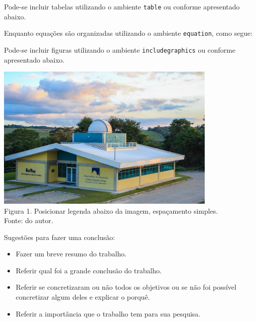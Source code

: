 \documentclass[a0paper,portrait]{baposter}
\begin{document}
\begin{poster}
{}

{Pode-se incluir tabelas utilizando o ambiente \texttt{table} ou conforme apresentado abaixo.

Enquanto equações são organizadas utilizando o ambiente \texttt{equation}, como segue:
}

{Pode-se incluir figuras utilizando o ambiente \texttt{includegraphics} ou conforme apresentado abaixo.

\begin{center}
\includegraphics[width=0.8\textwidth]{figures/observatorio.jpg}\\
Figura 1. Posicionar legenda abaixo da imagem, espaçamento simples.\\
Fonte: do autor.
\end{center}

}

{Sugestões para fazer uma conclusão:
\begin{itemize}
    \item Fazer um breve resumo do trabalho.
    \item Referir qual foi a grande conclusão do trabalho.
    \item Referir se concretizaram ou não todos os objetivos ou se não foi possível concretizar algum deles e explicar o porquê.
    \item Referir a importância que o trabalho tem para sua pesquisa.
\end{itemize}


}
\end{poster}
\end{document}
